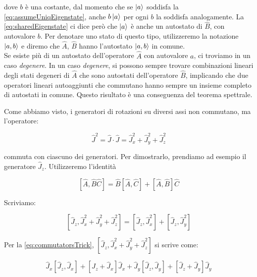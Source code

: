 dove $b$ \`e una costante, dal momento che se $\ket{a}$ soddisfa la \eqref{eq:assumeUniqEigenstate}, anche $b \ket{a}$ per ogni $b$ la soddisfa analogamente. La \eqref{eq:sharedEigenstate} ci dice per\`o che $\ket{a}$ \`e anche un autostato di $\hat{B}$, con autovalore $b$. Per denotare uno stato di questo tipo, utilizzeremo la notazione $\ket{a, b}$ e diremo che $\hat{A}$, $\hat{B}$ hanno l'autostato $\ket{a, b}$ in comune. \\

Se esiste pi\`u di un autostato dell'operatore $\hat{A}$ con autovalore $a$, ci troviamo in un caso \textit{degenere}. In un caso \textit{degenere}, si possono sempre trovare combinazioni lineari degli stati degeneri di $\hat{A}$ che sono autostati dell'operatore $\hat{B}$, implicando che due operatori lineari autoaggiunti che commutano hanno sempre un insieme completo di autostati in comune. Questo risultato \`e una conseguenza del teorema spettrale.

Come abbiamo visto, i generatori di rotazioni su diversi assi non commutano, ma l'operatore:

	\begin{equation}
		\hat{J}^2 = \hat{J} \cdot \hat{J} = \hat{J}_x^2 + \hat{J}_y^2 + \hat{J}_z^2
	\end{equation}

commuta con ciascuno dei generatori. Per dimostrarlo, prendiamo ad esempio il generatore $\hat{J}_z$. Utilizzeremo l'identit\`a

	\begin{equation} \label{eq:commutatorsTrick}
		\left [ \hat{A}, \hat{B}\hat{C} \right ] = \hat{B} \left [ \hat{A}, \hat{C} \right ] + \left [ \hat{A}, \hat{B} \right ] \hat{C}
	\end{equation}

Scriviamo:

	\begin{equation}
		\left [ \hat{J}_z, \hat{J}_x^2 + \hat{J}_y^2 + \hat{J}_z^2 \right ] = \left [ \hat{J}_z, \hat{J}_x^2 \right ] + \left [ \hat{J}_z, \hat{J}_y^2 \right ]
	\end{equation}

Per la \eqref{eq:commutatorsTrick}, $\left [ \hat{J}_z, \hat{J}_x^2 + \hat{J}_y^2 + \hat{J}_z^2 \right ]$ si scrive come:

	\begin{equation}
	 \hat{J}_x \left [ \hat{J}_z, \hat{J}_x \right ] + \left [ \hat{J}_z + \hat{J}_x \right ] \hat{J}_x + \hat{J}_y \left [ \hat{J}_z, \hat{J}_y \right ] + \left [ \hat{J}_z + \hat{J}_y \right ] \hat{J}_y 
	\end{equation}

